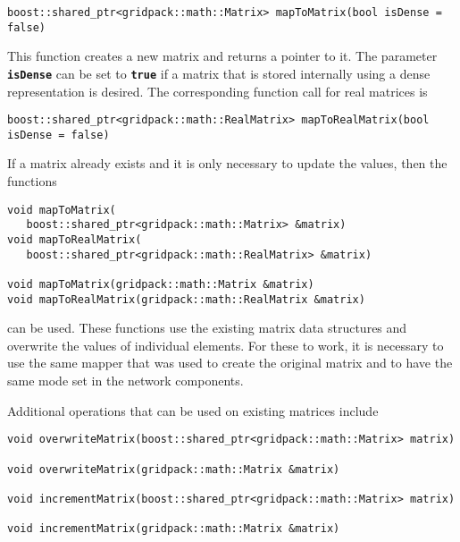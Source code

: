 {
\color{red}
\begin{Verbatim}[fontseries=b]
boost::shared_ptr<gridpack::math::Matrix> mapToMatrix(bool isDense = false)
\end{Verbatim}
}

This function creates a new matrix and returns a pointer to it. The parameter
\texttt{\textbf{isDense}} can be set to \texttt{\textbf{true}} if a matrix that
is stored internally using a dense representation is desired. The corresponding
function call for real matrices is

{
\color{red}
\begin{Verbatim}[fontseries=b]
boost::shared_ptr<gridpack::math::RealMatrix> mapToRealMatrix(bool isDense = false)
\end{Verbatim}
}

If a matrix already exists and it is only necessary to update the values, then the functions

{
\color{red}
\begin{Verbatim}[fontseries=b]
void mapToMatrix(
   boost::shared_ptr<gridpack::math::Matrix> &matrix)
void mapToRealMatrix(
   boost::shared_ptr<gridpack::math::RealMatrix> &matrix)

void mapToMatrix(gridpack::math::Matrix &matrix)
void mapToRealMatrix(gridpack::math::RealMatrix &matrix)
\end{Verbatim}
}

can be used. These functions use the existing matrix data structures and overwrite the values of individual elements. For these to work, it is necessary to use the same mapper that was used to create the original matrix and to have the same mode set in the network components.

Additional operations that can be used on existing matrices include

{
\color{red}
\begin{Verbatim}[fontseries=b]
void overwriteMatrix(boost::shared_ptr<gridpack::math::Matrix> matrix)

void overwriteMatrix(gridpack::math::Matrix &matrix)

void incrementMatrix(boost::shared_ptr<gridpack::math::Matrix> matrix)

void incrementMatrix(gridpack::math::Matrix &matrix)
\end{Verbatim}
}

